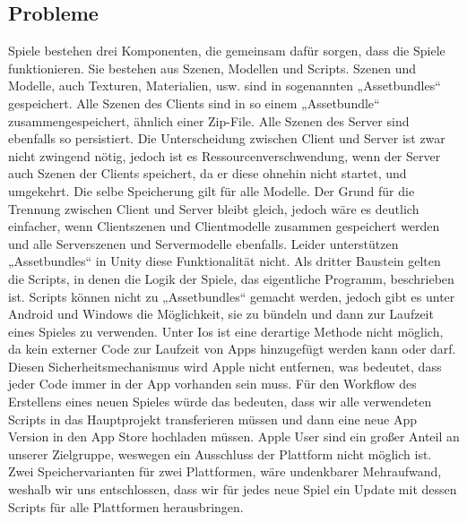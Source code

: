 \subsection{Probleme}
Spiele bestehen drei Komponenten, die gemeinsam dafür sorgen, dass die Spiele funktionieren. Sie bestehen aus Szenen, Modellen und Scripts. Szenen und Modelle, auch Texturen, Materialien, usw. sind in sogenannten „Assetbundles“ gespeichert. Alle Szenen des Clients sind in so einem „Assetbundle“ zusammengespeichert, ähnlich einer Zip-File. Alle Szenen des Server sind ebenfalls so persistiert. Die Unterscheidung zwischen Client und Server ist zwar nicht zwingend nötig, jedoch ist es Ressourcenverschwendung, wenn der Server auch Szenen der Clients speichert, da er diese ohnehin nicht startet, und umgekehrt. Die selbe Speicherung gilt für alle Modelle. Der Grund für die Trennung zwischen Client und Server bleibt gleich, jedoch wäre es deutlich einfacher, wenn Clientszenen und Clientmodelle zusammen gespeichert werden und alle Serverszenen und Servermodelle ebenfalls. Leider unterstützen „Assetbundles“ in Unity diese Funktionalität nicht. 
Als dritter Baustein gelten die Scripts, in denen die Logik der Spiele, das eigentliche Programm, beschrieben ist. Scripts können nicht zu „Assetbundles“ gemacht werden, jedoch gibt es unter Android und Windows die Möglichkeit, sie zu bündeln und dann zur Laufzeit eines Spieles zu verwenden. Unter Ios ist eine derartige Methode nicht möglich, da kein externer Code zur Laufzeit von Apps hinzugefügt werden kann oder darf. Diesen Sicherheitsmechanismus wird Apple nicht entfernen, was bedeutet, dass jeder Code immer in der App vorhanden sein muss. Für den Workflow des Erstellens eines neuen Spieles würde das bedeuten, dass wir alle verwendeten Scripts in das Hauptprojekt transferieren müssen und dann eine neue App Version in den App Store hochladen müssen. Apple User sind ein großer Anteil an unserer Zielgruppe, weswegen ein Ausschluss der Plattform nicht möglich ist. Zwei Speichervarianten für zwei Plattformen, wäre undenkbarer Mehraufwand, weshalb wir uns entschlossen, dass wir für jedes neue Spiel ein Update mit dessen Scripts für alle Plattformen herausbringen.
